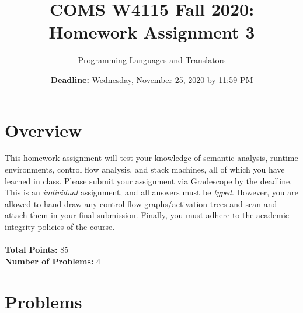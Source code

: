 \documentclass{article}[12pt]
\title{COMS W4115 Fall 2020: Homework Assignment 3}
\author{Programming Languages and Translators}
\date{\textbf{Deadline:} Wednesday, November 25, 2020 by 11:59 PM}
\begin{document}
\maketitle

\section*{Overview}

This homework assignment will test your knowledge of semantic analysis, runtime environments, control flow analysis, and stack machines, all of which you have learned in class. Please submit your assignment via Gradescope by the deadline. This is an \textit{individual} assignment, and all answers must be \textit{typed}. However, you are allowed to hand-draw any control flow graphs/activation trees and scan and attach them in your final submission. Finally, you must adhere to the academic integrity policies of the course.\\\\\textbf{Total Points:} 85\\\textbf{Number of Problems:} 4

\section*{Problems}
\end{document}
